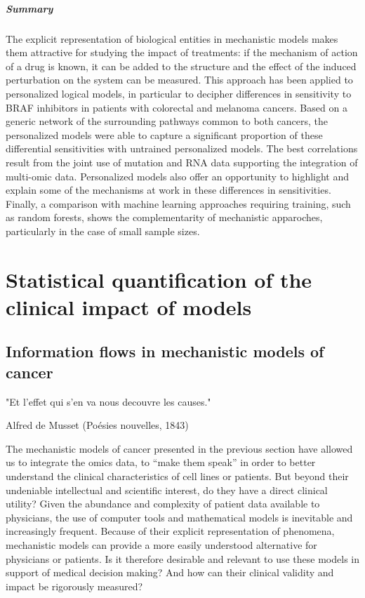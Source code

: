 \documentclass[a4paper,12pt,twoside,onecolumn,openright,final,oldfontcommands]{memoir}
\newcommand{\initial}[1]{
	\lettrine[lines=3,lhang=0.33,nindent=0em]{
		\color{gray}
     		{\textsc{#1}}}{}}
\let\BeginKnitrBlock\begin \let\EndKnitrBlock\end
\begin{document}
\BeginKnitrBlock{conclubox}
\subsubsection*{Summary}\label{summary-5}

The explicit representation of biological entities in mechanistic models
makes them attractive for studying the impact of treatments: if the
mechanism of action of a drug is known, it can be added to the structure
and the effect of the induced perturbation on the system can be
measured. This approach has been applied to personalized logical models,
in particular to decipher differences in sensitivity to BRAF inhibitors
in patients with colorectal and melanoma cancers. Based on a generic
network of the surrounding pathways common to both cancers, the
personalized models were able to capture a significant proportion of
these differential sensitivities with untrained personalized models. The
best correlations result from the joint use of mutation and RNA data
supporting the integration of multi-omic data. Personalized models also
offer an opportunity to highlight and explain some of the mechanisms at
work in these differences in sensitivities. Finally, a comparison with
machine learning approaches requiring training, such as random forests,
shows the complementarity of mechanistic apparoches, particularly in the
case of small sample sizes.
\EndKnitrBlock{conclubox}

\part{Statistical quantification of the clinical impact of
models}\label{part-statistical-quantification-of-the-clinical-impact-of-models}

\chapter{Information flows in mechanistic models of
cancer}\label{information-flows-in-mechanistic-models-of-cancer}

\epigraph{"Et l'effet qui s'en va nous decouvre les causes."}{Alfred de Musset (Poésies nouvelles, 1843)}

\initial{T}he mechanistic models of cancer presented in the previous
section have allowed us to integrate the omics data, to ``make them
speak'' in order to better understand the clinical characteristics of
cell lines or patients. But beyond their undeniable intellectual and
scientific interest, do they have a direct clinical utility? Given the
abundance and complexity of patient data available to physicians, the
use of computer tools and mathematical models is inevitable and
increasingly frequent. Because of their explicit representation of
phenomena, mechanistic models can provide a more easily understood
alternative for physicians or patients. Is it therefore desirable and
relevant to use these models in support of medical decision making? And
how can their clinical validity and impact be rigorously measured?
\end{document}
